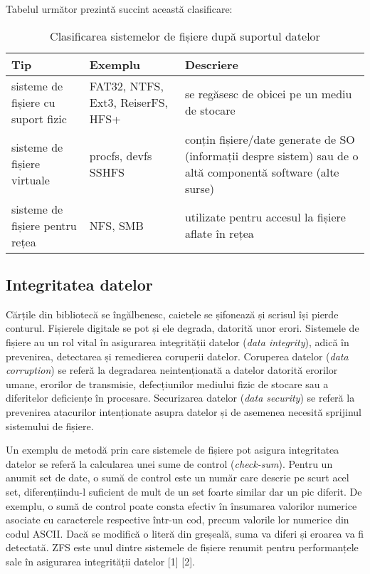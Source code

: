 Tabelul următor prezintă succint această clasificare:

\begin{table}[htb]
\caption{Clasificarea sistemelor de fișiere după suportul datelor}
\begin{center}
	\begin{tabular}{ | p{} | p{} | p{} | }
	\hline
		\textbf{Tip} & \textbf{Exemplu} & \textbf{Descriere} \\
	\hline
		sisteme de fișiere cu suport fizic & 	FAT32, NTFS, Ext3, ReiserFS, HFS+ & se
		regăsesc de obicei pe un mediu de stocare \\
	\hline
		sisteme de fișiere virtuale & 	procfs, devfs SSHFS & conțin fișiere/date generate
		de SO (informații despre sistem) sau de o altă componentă software (alte surse) \\
	\hline
		sisteme de fișiere pentru rețea & 	NFS, SMB & utilizate pentru accesul la
		fișiere aflate în rețea \\
	\hline
	\end{tabular}
	\label{table:fs-clasificare}
\end{center}
\end{table}

\subsection{Integritatea datelor}

Cărțile din bibliotecă se îngălbenesc, caietele se șifonează și scrisul își
pierde conturul.  Fișierele digitale se pot și ele degrada, datorită unor erori.
Sistemele de fișiere au un rol vital în asigurarea integrității datelor
(\textit{data integrity}), adică în prevenirea, detectarea și remedierea
coruperii datelor. Coruperea datelor (\textit{data corruption}) se referă la
degradarea neintenționată a datelor datorită erorilor umane, erorilor de
transmisie, defecțiunilor mediului fizic de stocare sau a diferitelor deficiențe
în procesare. Securizarea datelor (\textit{data security}) se referă la
prevenirea atacurilor intenționate asupra datelor și de asemenea necesită
sprijinul sistemului de fișiere.

Un exemplu de metodă prin care sistemele de fișiere pot asigura integritatea
datelor se referă la calcularea unei sume de control (\textit{check-sum}).
Pentru un anumit set de date, o sumă de control este un număr care descrie pe
scurt acel set, diferențiindu-l suficient de mult de un set foarte similar dar
un pic diferit. De exemplu, o sumă de control poate consta efectiv în însumarea
valorilor numerice asociate cu caracterele respective într-un cod, precum
valorile lor numerice din codul ASCII. Dacă se modifică o literă din greșeală,
suma va diferi și eroarea va fi detectată. ZFS este unul dintre sistemele de
fișiere renumit pentru performanțele sale în asigurarea integrității datelor [1]
[2].


